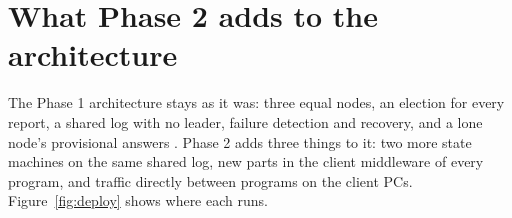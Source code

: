 \section{What Phase 2 adds to the architecture}
\label{sec:arch}

The Phase 1 architecture stays as it was: three equal nodes, an election for every report, a shared log with no leader, failure detection and recovery, and a lone node's provisional answers \cite{phase1}. Phase 2 adds three things to it: two more state machines on the same shared log, new parts in the client middleware of every program, and traffic directly between programs on the client PCs. Figure~\ref{fig:deploy} shows where each runs.

